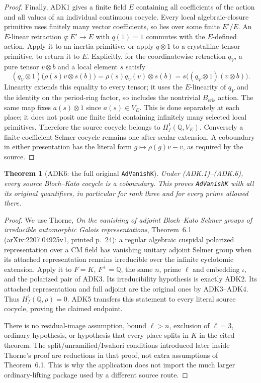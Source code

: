 \documentclass[11pt,a4paper]{article}
\numberwithin{equation}{section}
\newtheorem{theorem}{Theorem}[section]
\theoremstyle{remark}\newtheorem{remark}[theorem]{Remark}
\begin{document}
\begin{proof}
Finally, ADK1 gives a finite field $E$ containing all coefficients
of the action and all values of an individual continuous cocycle.
Every local algebraic-closure primitive uses finitely many vector
coefficients, so lies over some finite $E'/E$.  An $E$-linear
retraction $q:E'\to E$ with $q(1)=1$ commutes with the $E$-defined
action.  Apply it to an inertia primitive, or apply
$q\otimes1$ to a crystalline tensor primitive, to return it to
$E$.  Explicitly, for the coordinatewise retraction $q_V$, a pure
tensor $v\otimes b$ and a local element $s$ satisfy
\[
 (q_V\otimes1)\bigl(\rho(s)v\otimes s(b)\bigr)
     =\rho(s)q_V(v)\otimes s(b)
     =s\bigl((q_V\otimes1)(v\otimes b)\bigr).
\]
Linearity extends this equality to every tensor; it uses the
$E$-linearity of $q_V$ and the identity on the period-ring factor,
so includes the nontrivial $B_{\mathrm{cris}}$ action.  The same map
fixes $a(s)\otimes1$ since $a(s)\in V_E$.
This is done separately at each place; it does not posit one
finite field containing infinitely many selected local primitives.
Therefore the source cocycle belongs to $H^1_f(\mathbb Q,\allowbreak{} V_E)$.
Conversely a finite-coefficient Selmer cocycle remains one after
scalar extension.  A coboundary in either presentation has the
literal form $g\mapsto\rho(g)v-v$, as required by the source.
\end{proof}

\begin{theorem}[ADK6: the full original \texttt{Ad\allowbreak Vanish\allowbreak K}]
\label{claim:ADK6}
Under (ADK.1)--(ADK.6), every source Bloch--Kato cocycle is a
coboundary.  This proves \texttt{Ad\allowbreak Vanish\allowbreak K} with all its original
quantifiers, in particular for rank three and for every prime
allowed there.
\end{theorem}
\begin{proof}
We use Thorne, \emph{On the vanishing of adjoint Bloch--Kato Selmer
groups of irreducible automorphic Galois representations},
Theorem~6.1 (arXiv:2207.04925v1, printed p.~24): a regular algebraic
cuspidal polarized representation over a CM field has vanishing
unitary adjoint Selmer group when its attached representation
remains irreducible over the infinite cyclotomic extension.
Apply it to $F=K$, $F^+=\mathbb Q$, the same $n$, prime $\ell$ and
embedding $\iota$, and the polarized pair of ADK3.  Its
irreducibility hypothesis is exactly ADK2.  Its attached
representation and full adjoint are the original ones by ADK3--ADK4.
Thus $H^1_f(\mathbb Q,\rho)=0$.  ADK5 transfers this statement to
every literal source cocycle, proving the claimed endpoint.

There is no residual-image assumption, bound $\ell>n$, exclusion of
$\ell=3$, ordinary hypothesis, or hypothesis that every place splits
in $K$ in the cited theorem.  The split/unramified/Iwahori conditions
introduced later inside Thorne's proof are reductions in that proof,
not extra assumptions of Theorem~6.1.  This is why the application
does not import the much larger ordinary-lifting package used by a
different source route.
\end{proof}
\end{document}
